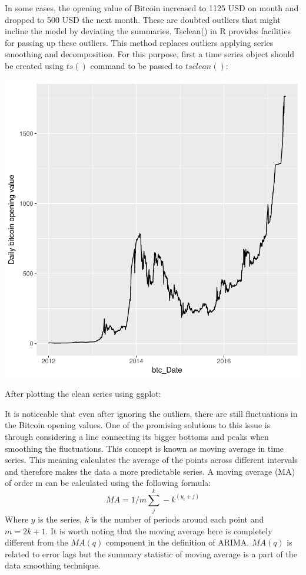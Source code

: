 \documentclass{article}
\begin{document}
In some cases, the opening value of Bitcoin increased to 1125 USD on month and dropped to 500 USD the next month. These are doubted outliers that might incline the model by deviating the summaries. Tsclean() in R provides facilities for passing up these outliers. This method replaces outliers applying series smoothing and decomposition. For this purpose, first a time series object should be created using $ts()$ command to be passed to $tsclean()$:
\begin{Schunk}
\end{Schunk}
\includegraphics{Report-009}

After plotting the clean series using ggplot:

It is noticeable that even after ignoring the outliers, there are still fluctuations in the Bitcoin opening values. One of the promising solutions to this issue is through considering a line connecting its bigger bottoms and peaks when smoothing the fluctuations. This concept is known as moving average in time series. This meaning calculates the average of the points across different intervals and therefore makes the data a more predictable series. 
A moving average (MA) of order m can be calculated using the following formula:
\[
MA=1/m \sum_{j}^{k}-k^(y_t+j) 
\]
Where $y$ is the series, $k$ is the number of periods around each point and $m=2k+1$.
It is worth noting that the moving average here is completely different from the $MA(q)$ component in the definition of ARIMA. $MA(q)$ is related to error lags but the summary statistic of moving average is a part of the data smoothing technique.
\end{document}
